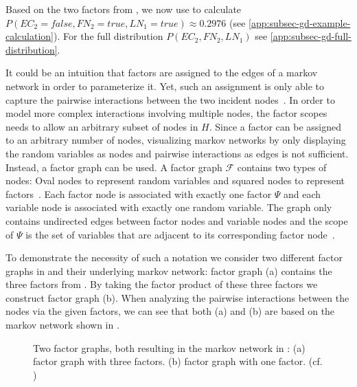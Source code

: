 Based on the two \glspl{factor} from , we now use  to calculate $P(EC_2=false,FN_2=true,LN_1=true)\approx 0.2976$ (see \cref{app:subsec-gd-example-calculation}).
For the full distribution $P(EC_2,FN_2,LN_1)$ see \cref{app:subsec-gd-full-distribution}.

\bigskip

It could be an intuition that \glspl{factor} are assigned to the edges of a \gls{markov network} in order to parameterize it.
Yet, such an assignment is only able to capture the pairwise interactions between the two incident nodes~\citep{koller2009probabilistic}.
In order to model more complex interactions involving multiple nodes, the \glspl{factor scope} needs to allow an arbitrary subset of nodes in $H$.
Since a factor can be assigned to an arbitrary number of nodes, visualizing \glspl{markov network} by only displaying the random variables as nodes and pairwise interactions as edges is not sufficient.
Instead, a \gls{factor graph} can be used.
A \gls{factor graph} $\mathcal{F}$ contains two types of \glspl{node}: Oval \glspl{node} to represent \glspl{random variable} and squared \glspl{node} to represent \glspl{factor}~\citep{koller2009probabilistic}.
Each factor node is associated with exactly one \gls{factor} $\Psi$ and each variable node is associated with exactly one \gls{random variable}.
The graph only contains undirected edges between factor nodes and variable nodes and the scope of $\Psi$ is the set of variables that are adjacent to its corresponding factor node~\citep{koller2009probabilistic}.

To demonstrate the necessity of such a notation we consider two different \glspl{factor graph} in  and their underlying \gls{markov network}:
\Gls{factor graph} (a) contains the three factors from .
By taking the \gls{factor product} of these three \glspl{factor} we construct \gls{factor graph} (b).
When analyzing the pairwise interactions between the nodes via the given \glspl{factor}, we can see that both (a) and (b) are based on the \gls{markov network} shown in  .

\begin{figure}[t]
\centering
  
\caption[Two factor graphs resulting in the same Markov network]{%
  Two \glspl{factor graph}, both resulting in the \gls{markov network} in :
  (a) \Gls{factor graph} with three \glspl{factor}.
  (b) \Gls{factor graph} with one \gls{factor}.
  (cf. \citep{koller2009probabilistic})
}
\label{fig:example-factor-graphs}
\end{figure}

